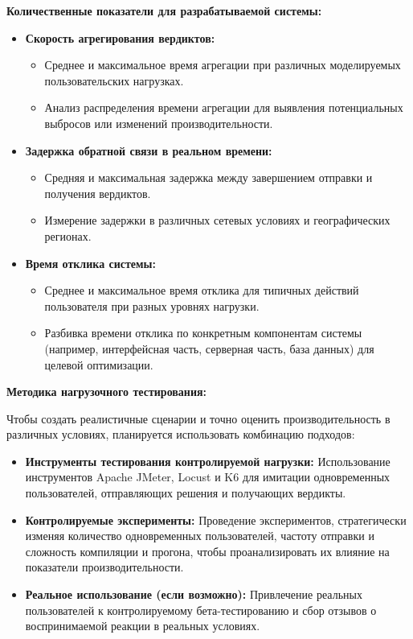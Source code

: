 \textbf{Количественные показатели для разрабатываемой системы:}
\noindent
\begin{itemize}
\item \textbf{Скорость агрегирования вердиктов:}
    \begin{itemize}
    \item Среднее и максимальное время агрегации при различных моделируемых пользовательских нагрузках.
    \item Анализ распределения времени агрегации для выявления потенциальных выбросов или изменений производительности.
    \end{itemize}
\item \textbf{Задержка обратной связи в реальном времени:}
    \begin{itemize}
    \item Средняя и максимальная задержка между завершением отправки и получения вердиктов.
    \item Измерение задержки в различных сетевых условиях и географических регионах.
    \end{itemize}
\item \textbf{Время отклика системы:}
    \begin{itemize}
    \item Среднее и максимальное время отклика для типичных действий пользователя при разных уровнях нагрузки.
    \item Разбивка времени отклика по конкретным компонентам системы (например, интерфейсная часть, серверная часть, база данных) для целевой оптимизации.
    \end{itemize}
\end{itemize}

\textbf{Методика нагрузочного тестирования:}

Чтобы создать реалистичные сценарии и точно оценить производительность в различных условиях, планируется использовать комбинацию подходов:
\begin{itemize}
    \item \textbf{Инструменты тестирования контролируемой нагрузки:} Использование инструментов Apache JMeter, Locust и K6 для имитации одновременных пользователей, отправляющих решения и получающих вердикты.
    \item \textbf{Контролируемые эксперименты:} Проведение экспериментов, стратегически изменяя количество одновременных пользователей, частоту отправки и сложность компиляции и прогона, чтобы проанализировать их влияние на показатели производительности.
    \item \textbf{Реальное использование (если возможно):} Привлечение реальных пользователей к контролируемому бета-тестированию и сбор отзывов о воспринимаемой реакции в реальных условиях.
\end{itemize}
